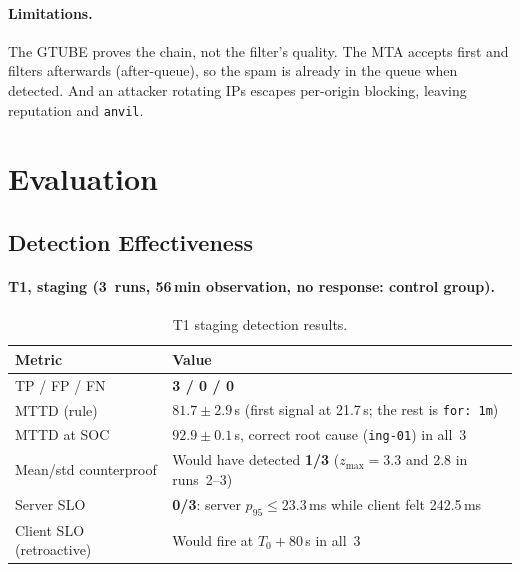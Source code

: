 \documentclass[11pt,a4paper]{article}
\begin{document}
\paragraph{Limitations.} The GTUBE proves the chain, not the filter's quality. The MTA
accepts first and filters afterwards (after-queue), so the spam is already in the queue when
detected. And an attacker rotating IPs escapes per-origin blocking, leaving reputation and
\texttt{anvil}.


\section{Evaluation}
\label{sec:evaluation}

\subsection{Detection Effectiveness}

\paragraph{T1, staging (3~runs, 56\,min observation, no response: control group).}

\begin{table}[H]
  \centering
  \caption{T1 staging detection results.}
  \begin{tabular}{@{}lp{8cm}@{}}
    \toprule
    \textbf{Metric} & \textbf{Value} \\
    \midrule
    TP / FP / FN & \textbf{3 / 0 / 0} \\
    MTTD (rule) & $81.7 \pm 2.9$\,s (first signal at 21.7\,s; the rest is \texttt{for: 1m}) \\
    MTTD at SOC & $92.9 \pm 0.1$\,s, correct root cause (\texttt{ing-01}) in all~3 \\
    Mean/std counterproof & Would have detected \textbf{1/3} ($z_{\max} = 3.3$ and 2.8 in runs~2--3) \\
    Server SLO & \textbf{0/3}: server $p_{95} \leq 23.3$\,ms while client felt 242.5\,ms \\
    Client SLO (retroactive) & Would fire at $T_0 + 80$\,s in all~3 \\
    \bottomrule
  \end{tabular}
\end{table}
\end{document}

